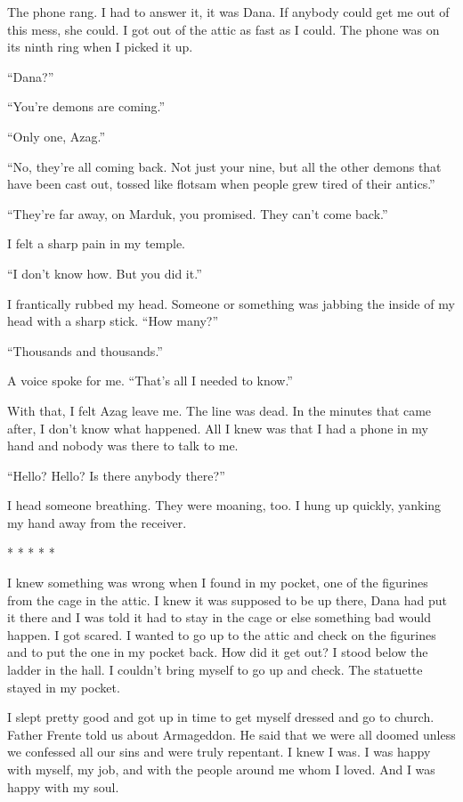 The phone rang. I had to answer it, it was Dana. If anybody could get me
out of this mess, she could. I got out of the attic as fast as I could.
The phone was on its ninth ring when I picked it up.

``Dana?''

``You're demons are coming.''

``Only one, Azag.''

``No, they're all coming back. Not just your nine, but all the other
demons that have been cast out, tossed like flotsam when people grew
tired of their antics.''

``They're far away, on Marduk, you promised. They can't come back.''

I felt a sharp pain in my temple.

``I don't know how. But you did it.''

I frantically rubbed my head. Someone or something was jabbing the
inside of my head with a sharp stick. ``How many?''

``Thousands and thousands.''

A voice spoke for me. ``That's all I needed to know.''

With that, I felt Azag leave me. The line was dead. In the minutes that
came after, I don't know what happened. All I knew was that I had a
phone in my hand and nobody was there to talk to me.

``Hello? Hello? Is there anybody there?''

I head someone breathing. They were moaning, too. I hung up quickly,
yanking my hand away from the receiver.

* * * * *

I knew something was wrong when I found in my pocket, one of the
figurines from the cage in the attic. I knew it was supposed to be up
there, Dana had put it there and I was told it had to stay in the cage
or else something bad would happen. I got scared. I wanted to go up to
the attic and check on the figurines and to put the one in my pocket
back. How did it get out? I stood below the ladder in the hall. I
couldn't bring myself to go up and check. The statuette stayed in my
pocket.

I slept pretty good and got up in time to get myself dressed and go to
church. Father Frente told us about Armageddon. He said that we were all
doomed unless we confessed all our sins and were truly repentant. I knew
I was. I was happy with myself, my job, and with the people around me
whom I loved. And I was happy with my soul.

